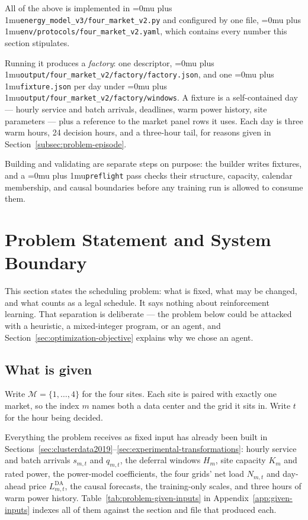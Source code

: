 ﻿\documentclass[12pt]{article}
\newcommand{\codepath}[1]{{\Urlmuskip=0mu plus 1mu\relax\nolinkurl{#1}}}
\begin{document}
All of the above is implemented in
\codepath{energy_model_v3/four_market_v2.py} and configured by one file,
\codepath{env/protocols/four_market_v2.yaml}, which contains every number this
section stipulates.

Running it produces a \emph{factory}: one descriptor,
\codepath{output/four_market_v2/factory/factory.json}, and one
\codepath{fixture.json} per day under
\codepath{output/four_market_v2/factory/windows}. A fixture is a self-contained
day --- hourly service and batch arrivals, deadlines, warm power history, site
parameters --- plus a reference to the market panel rows it uses. Each day is
three warm hours, 24 decision hours, and a three-hour tail, for reasons given in
Section~\ref{subsec:problem-episode}.

Building and validating are separate steps on purpose: the builder writes
fixtures, and a \codepath{preflight} pass checks their structure, capacity,
calendar membership, and causal boundaries before any training run is allowed to
consume them.

\section{Problem Statement and System Boundary}
\label{sec:problem-statement}

This section states the scheduling problem: what is fixed, what may be changed,
and what counts as a legal schedule. It says nothing about reinforcement
learning. That separation is deliberate --- the problem below could be attacked
with a heuristic, a mixed-integer program, or an agent, and
Section~\ref{sec:optimization-objective} explains why we chose an agent.

\subsection{What is given}
\label{subsec:problem-given-inputs}

Write \(\mathcal{M}=\{1,\ldots,4\}\) for the four sites. Each site is paired
with exactly one market, so the index \(m\) names both a data center and the
grid it sits in. Write \(t\) for the hour being decided.

Everything the problem receives as fixed input has already been built in
Sections~\ref{sec:clusterdata2019}--\ref{sec:experimental-transformations}:
hourly service and batch arrivals \(s_{m,t}\) and \(q_{m,t}\), the deferral
windows \(H_m\), site capacity \(K_m\) and rated power, the power-model
coefficients, the four grids' net load \(N_{m,t}\) and day-ahead price
\(L^{\mathrm{DA}}_{m,t}\), the causal forecasts, the training-only scales, and
three hours of warm power history.
Table~\ref{tab:problem-given-inputs} in Appendix~\ref{app:given-inputs} indexes
all of them against the section and file that produced each.
\end{document}
